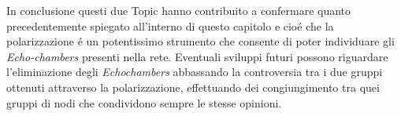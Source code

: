 In conclusione questi due Topic hanno contribuito a confermare quanto precedentemente spiegato all'interno di questo capitolo e cio\'e che la polarizzazione \'e un potentissimo strumento che consente di poter individuare gli \textit{Echo-chambers} presenti nella rete. %
Eventuali sviluppi futuri possono riguardare l'eliminazione degli \textit{Echochambers} abbassando la controversia tra i due gruppi ottenuti attraverso la polarizzazione, effettuando dei congiungimento tra quei gruppi di nodi che condividono sempre le stesse opinioni.
\begin{comment}
\section{Inquadramento generale}
La prima parte contiene una frase che spiega l'area generale dove si svolge il lavoro; una che spiega la sottoarea pi\`u specifica dove si svolge il lavoro e la terza, che dovrebbe cominciare con le seguenti parole ``lo scopo della tesi \`e \dots'', illustra l'obbiettivo del lavoro. Poi vi devono essere una o due frasi che contengano una breve spiegazione di cosa e come \`e stato fatto, delle attivit\`a� sperimentali, dei risultati ottenuti con una valutazione e degli sviluppi futuri. La prima parte deve essere circa una facciata e mezza o due

\section{Breve descrizione del lavoro}
La seconda parte deve essere una esplosione della prima e deve quindi mostrare in maniera pi\`u esplicita l'area dove si svolge il lavoro, le fonti bibliografiche pi\`u importanti su cui si fonda il lavoro in maniera sintetica (una pagina) evidenziando i lavori in letteratura che presentano attinenza con il lavoro affrontato in modo da mostrare da dove e perch\'e \`e sorta la tematica di studio. Poi si mostrano esplicitamente le realizzazioni, le direttive future di ricerca, quali sono i problemi aperti e quali quelli affrontati e si ripete lo scopo della tesi. Questa parte deve essere piena (ma non grondante come la sezione due) di citazioni bibliografiche e deve essere lunga circa 4 facciate.


\end{comment}

